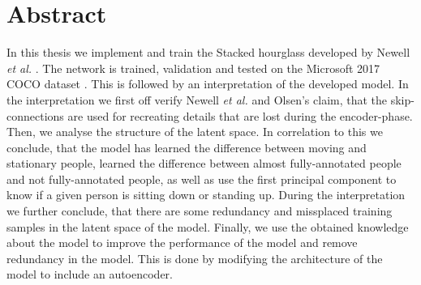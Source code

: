 \documentclass[./main.tex]{subfiles}
\begin{document}
\section{Abstract}
In this thesis we implement and train the Stacked hourglass developed by Newell \textit{et al.} \cite{Newell}. The network is trained, validation and tested on the Microsoft 2017 COCO dataset \cite{COCO_article}. This is followed by an interpretation of the developed model. In the interpretation we first off verify Newell \textit{et al.} \cite{Newell} and Olsen's \cite{Camilla} claim, that the skip-connections are used for recreating details that are lost during the encoder-phase. Then, we analyse the structure of the latent space. In correlation to this we conclude, that the model has learned the difference between moving and stationary people, learned the difference between almost fully-annotated people and not fully-annotated people, as well as use the first principal component to know if a given person is sitting down or standing up. During the interpretation we further conclude, that there are some redundancy and missplaced training samples in the latent space of the model. Finally, we use the obtained knowledge about the model to improve the performance of the model and remove redundancy in the model. This is done by modifying the architecture of the model to include an autoencoder. 
\end{document}
